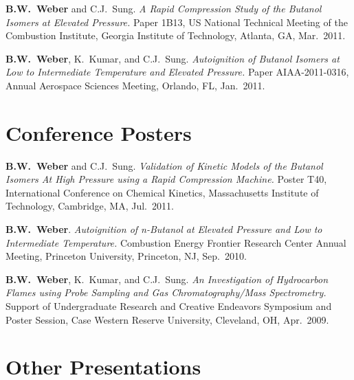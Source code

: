 \begin{bibmune}
\item \textbf{B.W.\ Weber} and C.J.\ Sung. \textit{A Rapid Compression
        Study of the Butanol Isomers at Elevated Pressure.} Paper 1B13,
          US National Technical Meeting of the Combustion
        Institute, Georgia Institute of Technology, Atlanta, GA, Mar.\
        2011.

\item \textbf{B.W.\ Weber}, K.\ Kumar, and C.J.\ Sung.
        \textit{Autoignition of Butanol Isomers at Low to Intermediate
        Temperature and Elevated Pressure.} Paper AIAA-2011-0316,
        \ordinalnum{49}  Annual Aerospace Sciences Meeting,
        Orlando, FL, Jan.\ 2011.
\end{bibmune}

\section{{\sectionfont Conference Posters}}

\begin{bibmune}
\item \textbf{B.W.\ Weber} and C.J.\ Sung. \textit{Validation of
        Kinetic Models of the Butanol Isomers At High Pressure
        using a Rapid Compression Machine.} Poster T40,
         International Conference on Chemical Kinetics,
         Massachusetts Institute of Technology, Cambridge, MA,
         Jul.\ 2011.

\item \textbf{B.W.\ Weber}. \textit{Autoignition of n-Butanol at
        Elevated Pressure and Low to Intermediate Temperature.}
         Combustion Energy Frontier Research Center
        Annual Meeting, Princeton University, Princeton, NJ,
        Sep.\ 2010.

\item \textbf{B.W.\ Weber}, K.\ Kumar, and C.J.\ Sung. \textit{An
        Investigation of Hydrocarbon Flames using Probe Sampling and
        Gas Chromatography/Mass Spectrometry.} Support of Undergraduate
        Research and Creative Endeavors Symposium and Poster Session,
        Case Western Reserve University, Cleveland, OH, Apr.\ 2009.
\end{bibmune}

\section{{\sectionfont Other Presentations}}

